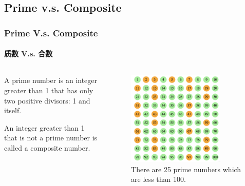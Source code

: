 \documentclass[
	11pt, %
]{beamer}
\begin{document}
\subsection{Prime v.s. Composite}
\begin{frame}
	\frametitle{Prime V.s. Composite}
	\framesubtitle{质数 V.s. 合数}
	\begin{columns}[t]
	\begin{column}{0.45\textwidth}
	\begin{definition}
		  A \alert{prime number} is an integer \alert{greater than 1} that has only two positive divisors: 1 and itself.
	  \end{definition}

	  \begin{definition}
		  An integer \alert{greater than 1} that is \alert{not} a prime number is called a \alert{composite} number.
	  \end{definition}
	\end{column}
	\begin{column}{0.5\textwidth}
	  	\begin{figure}
		\includegraphics[width=0.8\textwidth]{Prime_Numbers.png}
		\caption{There are 25 prime numbers which are less than 100.}
	\end{figure}
	\end{column}
	\end{columns}


\end{frame}

\end{document}
